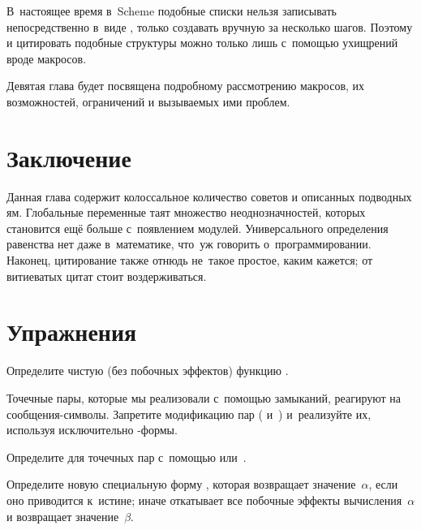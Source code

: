 В~настоящее время в~Scheme подобные списки нельзя записывать непосредственно
в~виде , только создавать вручную за несколько шагов. Поэтому и
цитировать подобные структуры можно только лишь с~помощью ухищрений вроде
макросов.

Девятая глава будет посвящена подробному рассмотрению макросов, их возможностей,
ограничений и вызываемых ими проблем. 


\section{Заключение}\label{assignment/sect:conclusions}

Данная глава содержит колоссальное количество советов и описанных подводных ям.
Глобальные переменные таят множество неоднозначностей, которых становится ещё
больше с~появлением модулей. Универсального определения равенства нет даже
в~математике, что~уж говорить о~программировании. Наконец, цитирование также
отнюдь не~такое простое, каким кажется; от витиеватых цитат стоит
воздерживаться.


\section{Упражнения}\label{assignment/sect:exercises}

\begin{exercise}\label{assignment/ex:pure-min-max}
Определите чистую (без побочных эффектов) функцию .
\end{exercise}

\begin{exercise}\label{assignment/ex:lambda-cons}
Точечные пары, которые мы реализовали с~помощью замыканий, реагируют на
сообщения-символы. Запретите модификацию пар ( и~)
и~реализуйте их, используя исключительно -формы.
\end{exercise}

\begin{exercise}\label{assignment/ex:destructive-eq}
Определите  для точечных пар с~помощью  или~.
\end{exercise}

\begin{exercise}\label{assignment/ex:form-or}
Определите новую специальную форму , которая
возвращает значение~$\alpha$, если оно приводится к~истине; иначе 
откатывает все побочные эффекты вычисления~$\alpha$ и возвращает
значение~$\beta$.
\end{exercise}

